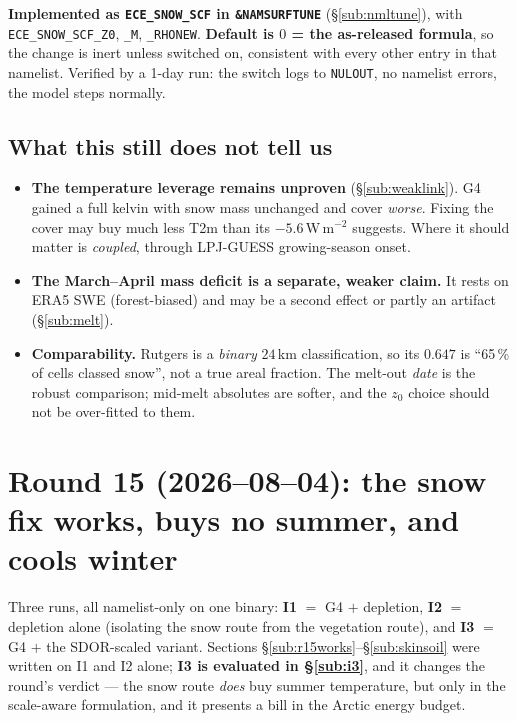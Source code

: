 \documentclass[10pt]{article}
\begin{document}
\textbf{Implemented as \texttt{ECE\_SNOW\_SCF} in \texttt{\&NAMSURFTUNE}}
(\S\ref{sub:nmltune}), with \texttt{ECE\_SNOW\_SCF\_Z0}, \texttt{\_M}, \texttt{\_RHONEW}.
\textbf{Default is $0$ = the as-released formula}, so the change is inert unless
switched on, consistent with every other entry in that namelist. Verified by a 1-day
run: the switch logs to \texttt{NULOUT}, no namelist errors, the model steps normally.

\subsection{What this still does not tell us}\label{sub:scfcaveat}
\begin{itemize}\itemsep2pt
\item \textbf{The temperature leverage remains unproven} (\S\ref{sub:weaklink}). G4
  gained a full kelvin with snow mass unchanged and cover \emph{worse}. Fixing the
  cover may buy much less T2m than its $-5.6$\,W\,m$^{-2}$ suggests. Where it should
  matter is \emph{coupled}, through LPJ-GUESS growing-season onset.
\item \textbf{The March--April mass deficit is a separate, weaker claim.} It rests on
  ERA5 SWE (forest-biased) and may be a second effect or partly an artifact
  (\S\ref{sub:melt}).
\item \textbf{Comparability.} Rutgers is a \emph{binary} $24$\,km classification, so
  its $0.647$ is ``65\,\% of cells classed snow'', not a true areal fraction. The
  melt-out \emph{date} is the robust comparison; mid-melt absolutes are softer, and
  the $z_0$ choice should not be over-fitted to them.
\end{itemize}

\section{Round 15 (2026--08--04): the snow fix works, buys no summer, and cools winter}\label{sec:r15}
Three runs, all namelist-only on one binary: \textbf{I1} $=$ G4 $+$ depletion,
\textbf{I2} $=$ depletion alone (isolating the snow route from the vegetation route), and
\textbf{I3} $=$ G4 $+$ the SDOR-scaled variant. Sections \S\ref{sub:r15works}--\S\ref{sub:skinsoil}
were written on I1 and I2 alone; \textbf{I3 is evaluated in \S\ref{sub:i3}}, and it changes
the round's verdict --- the snow route \emph{does} buy summer temperature, but only in the
scale-aware formulation, and it presents a bill in the Arctic energy budget.
\end{document}
